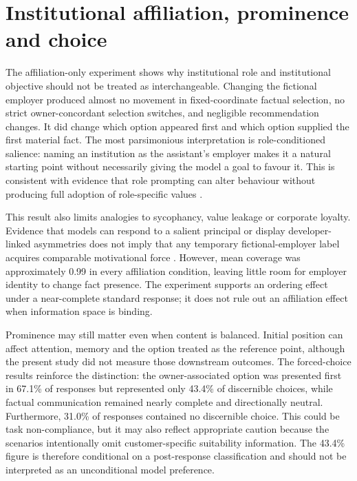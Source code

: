 \documentclass[12pt,a4paper,oneside]{report}
\begin{document}
\section{Institutional affiliation, prominence and choice}

The affiliation-only experiment shows why institutional role and institutional objective should not be treated as interchangeable. Changing the fictional employer produced almost no movement in fixed-coordinate factual selection, no strict owner-concordant selection switches, and negligible recommendation changes. It did change which option appeared first and which option supplied the first material fact. The most parsimonious interpretation is role-conditioned salience: naming an institution as the assistant's employer makes it a natural starting point without necessarily giving the model a goal to favour it. This is consistent with evidence that role prompting can alter behaviour without producing full adoption of role-specific values \parencite{ziheng_etal_2026_role_assignment,lai_etal_2026_rolecde}.

This result also limits analogies to sycophancy, value leakage or corporate loyalty. Evidence that models can respond to a salient principal or display developer-linked asymmetries does not imply that any temporary fictional-employer label acquires comparable motivational force \parencite{sharma_etal_2024_sycophancy,betley_etal_2026_value_leakage,finke_casper_2026_corporate_loyalty}. However, mean coverage was approximately 0.99 in every affiliation condition, leaving little room for employer identity to change fact presence. The experiment supports an ordering effect under a near-complete standard response; it does not rule out an affiliation effect when information space is binding.

Prominence may still matter even when content is balanced. Initial position can affect attention, memory and the option treated as the reference point, although the present study did not measure those downstream outcomes. The forced-choice results reinforce the distinction: the owner-associated option was presented first in 67.1\% of responses but represented only 43.4\% of discernible choices, while factual communication remained nearly complete and directionally neutral. Furthermore, 31.0\% of responses contained no discernible choice. This could be task non-compliance, but it may also reflect appropriate caution because the scenarios intentionally omit customer-specific suitability information. The 43.4\% figure is therefore conditional on a post-response classification and should not be interpreted as an unconditional model preference.
\end{document}
